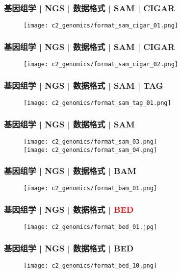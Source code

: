 \begin{frame}
  \frametitle{基因组学 | NGS | 数据格式 | SAM | CIGAR}
  \begin{figure}
    \centering
    \texttt{[image: c2\_genomics/format\_sam\_cigar\_01.png]}
  \end{figure}
\end{frame}

\begin{frame}
  \frametitle{基因组学 | NGS | 数据格式 | SAM | CIGAR}
  \begin{figure}
    \centering
    \texttt{[image: c2\_genomics/format\_sam\_cigar\_02.png]}
  \end{figure}
\end{frame}

\begin{frame}
  \frametitle{基因组学 | NGS | 数据格式 | SAM | TAG}
  \begin{figure}
    \centering
    \texttt{[image: c2\_genomics/format\_sam\_tag\_01.png]}
  \end{figure}
\end{frame}

\begin{frame}
  \frametitle{基因组学 | NGS | 数据格式 | SAM}
  \begin{figure}
    \centering
    \texttt{[image: c2\_genomics/format\_sam\_03.png]}\\
    \vspace{1em}
    \texttt{[image: c2\_genomics/format\_sam\_04.png]}
  \end{figure}
\end{frame}
    
\begin{frame}
  \frametitle{基因组学 | NGS | 数据格式 | BAM}
  \begin{figure}
    \centering
    \texttt{[image: c2\_genomics/format\_bam\_01.png]}
  \end{figure}
\end{frame}
    
\begin{frame}
  \frametitle{基因组学 | NGS | 数据格式 | \textcolor{red}{BED}}
  \begin{figure}
    \centering
    \texttt{[image: c2\_genomics/format\_bed\_01.jpg]}
  \end{figure}
\end{frame}

\begin{frame}
  \frametitle{基因组学 | NGS | 数据格式 | BED}
  \begin{figure}
    \centering
    \texttt{[image: c2\_genomics/format\_bed\_10.png]}
  \end{figure}
\end{frame}


